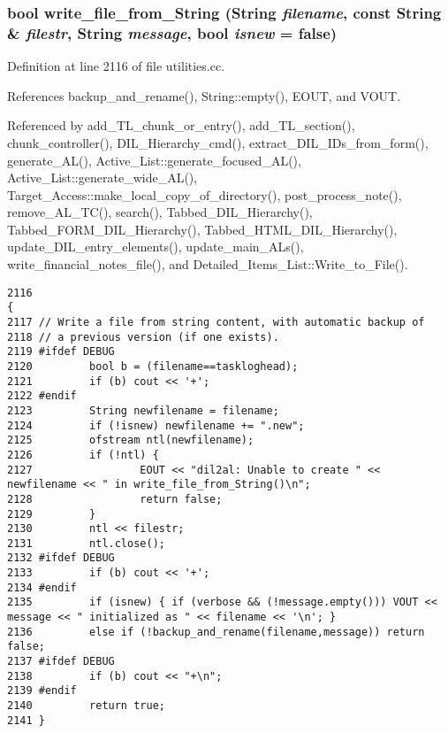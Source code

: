 \subsubsection{\setlength{\rightskip}{0pt plus 5cm}bool write\_\-file\_\-from\_\-String ({\bf String} {\em filename}, const {\bf String} \& {\em filestr}, {\bf String} {\em message}, bool {\em isnew} = {\bf false})}\label{utilities_8cc_a41}




Definition at line 2116 of file utilities.cc.

References backup\_\-and\_\-rename(), String::empty(), EOUT, and VOUT.

Referenced by add\_\-TL\_\-chunk\_\-or\_\-entry(), add\_\-TL\_\-section(), chunk\_\-controller(), DIL\_\-Hierarchy\_\-cmd(), extract\_\-DIL\_\-IDs\_\-from\_\-form(), generate\_\-AL(), Active\_\-List::generate\_\-focused\_\-AL(), Active\_\-List::generate\_\-wide\_\-AL(), Target\_\-Access::make\_\-local\_\-copy\_\-of\_\-directory(), post\_\-process\_\-note(), remove\_\-AL\_\-TC(), search(), Tabbed\_\-DIL\_\-Hierarchy(), Tabbed\_\-FORM\_\-DIL\_\-Hierarchy(), Tabbed\_\-HTML\_\-DIL\_\-Hierarchy(), update\_\-DIL\_\-entry\_\-elements(), update\_\-main\_\-ALs(), write\_\-financial\_\-notes\_\-file(), and Detailed\_\-Items\_\-List::Write\_\-to\_\-File().



\footnotesize\begin{verbatim}2116                                                                                                          {
2117 // Write a file from string content, with automatic backup of
2118 // a previous version (if one exists).
2119 #ifdef DEBUG
2120         bool b = (filename==taskloghead);
2121         if (b) cout << '+';
2122 #endif
2123         String newfilename = filename;
2124         if (!isnew) newfilename += ".new";
2125         ofstream ntl(newfilename);
2126         if (!ntl) {
2127                 EOUT << "dil2al: Unable to create " << newfilename << " in write_file_from_String()\n";
2128                 return false;
2129         }
2130         ntl << filestr;
2131         ntl.close();
2132 #ifdef DEBUG
2133         if (b) cout << '+';
2134 #endif
2135         if (isnew) { if (verbose && (!message.empty())) VOUT << message << " initialized as " << filename << '\n'; }
2136         else if (!backup_and_rename(filename,message)) return false;
2137 #ifdef DEBUG
2138         if (b) cout << "+\n";
2139 #endif
2140         return true;
2141 }
\end{verbatim}\normalsize 


